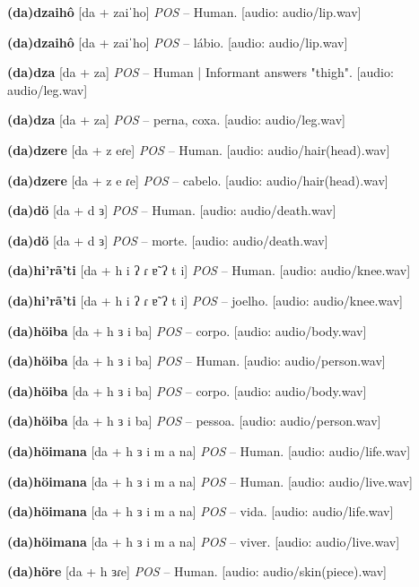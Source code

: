 \textbf{(da)dzaihô} [da + zaiˈho] \textit{POS} -- Human. [audio: audio/lip.wav]{\faHeadphones}

\textbf{(da)dzaihô} [da + zaiˈho] \textit{POS} -- lábio. [audio: audio/lip.wav]{\faHeadphones}

\textbf{(da)dza} [da + za] \textit{POS} -- Human | Informant answers "thigh". [audio: audio/leg.wav]{\faHeadphones}

\textbf{(da)dza} [da + za] \textit{POS} -- perna, coxa. [audio: audio/leg.wav]{\faHeadphones}

\textbf{(da)dzere} [da + z eɾe] \textit{POS} -- Human. [audio: audio/hair(head).wav]{\faHeadphones}

\textbf{(da)dzere} [da + z e ɾe] \textit{POS} -- cabelo. [audio: audio/hair(head).wav]{\faHeadphones}

\textbf{(da)dö} [da + d ɜ] \textit{POS} -- Human. [audio: audio/death.wav]{\faHeadphones}

\textbf{(da)dö} [da + d ɜ] \textit{POS} -- morte. [audio: audio/death.wav]{\faHeadphones}

\textbf{(da)hi'rã'ti} [da + h i ʔ ɾ ɐ̃ ʔ t i] \textit{POS} -- Human. [audio: audio/knee.wav]{\faHeadphones}

\textbf{(da)hi'rã'ti} [da + h i ʔ ɾ ɐ̃ ʔ t i] \textit{POS} -- joelho. [audio: audio/knee.wav]{\faHeadphones}

\textbf{(da)höiba} [da + h ɜ i ba] \textit{POS} -- corpo. [audio: audio/body.wav]{\faHeadphones}

\textbf{(da)höiba} [da + h ɜ i ba] \textit{POS} -- Human. [audio: audio/person.wav]{\faHeadphones}

\textbf{(da)höiba} [da + h ɜ i ba] \textit{POS} -- corpo. [audio: audio/body.wav]{\faHeadphones}

\textbf{(da)höiba} [da + h ɜ i ba] \textit{POS} -- pessoa. [audio: audio/person.wav]{\faHeadphones}

\textbf{(da)höimana} [da + h ɜ i m a na] \textit{POS} -- Human. [audio: audio/life.wav]{\faHeadphones}

\textbf{(da)höimana} [da + h ɜ i m a na] \textit{POS} -- Human. [audio: audio/live.wav]{\faHeadphones}

\textbf{(da)höimana} [da + h ɜ i m a na] \textit{POS} -- vida. [audio: audio/life.wav]{\faHeadphones}

\textbf{(da)höimana} [da + h ɜ i m a na] \textit{POS} -- viver. [audio: audio/live.wav]{\faHeadphones}

\textbf{(da)höre} [da + h ɜɾe] \textit{POS} -- Human. [audio: audio/skin(piece).wav]{\faHeadphones}

